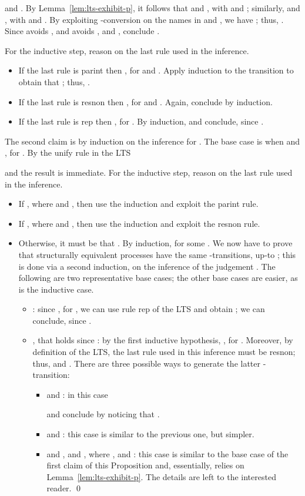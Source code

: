 \documentclass{LMCS}
\begin{document}
and . By Lemma~\ref{lem:lts-exhibit-p}, it follows that 
 and
, with 
and ; similarly, 
 and , 
with 
and .
By exploiting -conversion on the names in  and , we have 
;
thus, .
Since  avoids  ,  and
 avoids ,  and
, conclude 
.

For the inductive step, reason on the last rule used in the inference.
\begin{itemize}
	\item If the last rule is {\sf parint} then ,
				for  and .
				Apply induction to the transition  to obtain that ;
				thus, .
	\item If the last rule is {\sf resnon} then , for  and .
				Again, conclude by induction.
	\item If the last rule is {\sf rep} then , for .
				By induction,  and conclude, since .
\end{itemize}

\medskip\noindent
The second claim is by induction on the inference for .
The base case is when  and ,
for . By the {\sf unify} rule in the LTS
        
and the result is immediate.
For the inductive step, reason on the last rule used in the inference.
\begin{itemize}
	\item If , where  and ,
		then use the induction and exploit the {\sf parint} rule.
	\item If , where  and ,
		then use the induction and exploit the {\sf resnon} rule.
	\item Otherwise, it must be that . 
		By induction,  for some .
		We now have to prove that structurally equivalent processes have
		the same -transitions, up-to ; this is done via
		a second induction, on the inference of the judgement .
		The following are two representative base cases; the other base cases are easier,
		as is the inductive case.
		\begin{itemize}
		\item : since , for ,
			we can use rule {\sf rep} of the LTS and obtain ; 
			we can conclude, since .
		\item , that holds since
			: by the first inductive hypothesis, 
			, for . Moreover, by definition
			of the LTS, the last rule used in this inference must be {\sf resnon}; thus, 
			 and . There are three possible
			ways to generate the latter -transition:
			\begin{itemize}
			\item  and : in this case
			
			and conclude by noticing that .
		\item  and : this case is similar to the previous one, but simpler.
		\item  and , and , where ,
			 and :
			this case is similar to the base case of the first claim of this Proposition and, essentially, relies
			on Lemma~\ref{lem:lts-exhibit-p}. The details are left to the interested reader.
\qed
			\end{itemize}
		\end{itemize}
\end{itemize}
\end{document}
